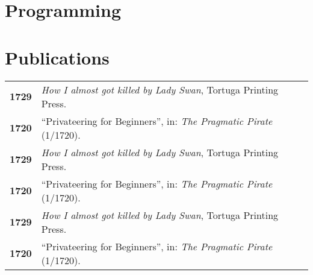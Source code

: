 \documentclass{modernsimplecv}
\newlength{\rightcolwidth}
\begin{document}
\begin{paracol}{2}

\lipsum[10]



\bigskip

\section{Programming} 
{\small
\lipsum[20]

}
\bigskip

\begin{skillsection}{\rightcolwidth}
\end{skillsection}


\bigskip



\vspace{4em}


\begin{minipage}[t]{\rightcolwidth}
\section*{Publications}
\begin{tabular}{>{\footnotesize\bfseries}r >{\footnotesize}p{}}
    1729 & \emph{How I almost got killed by Lady Swan}, Tortuga Printing Press. \\
    1720 & ``Privateering for Beginners'', in: \emph{The Pragmatic Pirate} (1/1720).\\
    1729 & \emph{How I almost got killed by Lady Swan}, Tortuga Printing Press. \\
    1720 & ``Privateering for Beginners'', in: \emph{The Pragmatic Pirate} (1/1720).\\
    1729 & \emph{How I almost got killed by Lady Swan}, Tortuga Printing Press. \\
    1720 & ``Privateering for Beginners'', in: \emph{The Pragmatic Pirate} (1/1720).
\end{tabular}
\bigskip


\end{minipage}
\end{paracol}
\end{document}
